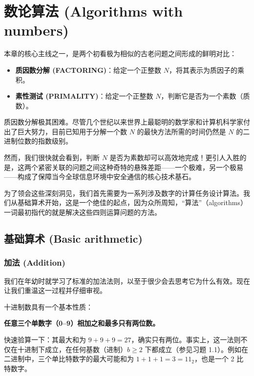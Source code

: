 \chapter{数论算法 (Algorithms with numbers)}

本章的核心主线之一，是两个初看极为相似的古老问题之间形成的鲜明对比：
\begin{itemize}
    \item \textbf{质因数分解 (FACTORING)}：给定一个正整数 $N$，将其表示为质因子的乘积。
    \item \textbf{素性测试 (PRIMALITY)}：给定一个正整数 $N$，判断它是否为一个素数（质数）。
\end{itemize}

质因数分解极其困难。尽管几个世纪以来世界上最聪明的数学家和计算机科学家付出了巨大努力，目前已知用于分解一个数 $N$ 的最快方法所需的时间仍然是 $N$ 的二进制位数的指数级别。

然而，我们很快就会看到，判断 $N$ 是否为素数却可以高效地完成！更引人入胜的是，这两个紧密关联的问题之间这种奇特的悬殊差距——一个极难，另一个极易——构成了保障当今全球信息环境中安全通信的核心技术基石。

为了领会这些深刻洞见，我们首先需要为一系列涉及数字的计算任务设计算法。我们从基础算术开始，这是一个绝佳的起点，因为众所周知，“算法”（algorithms）一词最初指代的就是解决这些四则运算问题的方法。

\section{基础算术 (Basic arithmetic)}

\subsection{加法 (Addition)}
我们在年幼时就学习了标准的加法法则，以至于很少会去思考它为什么有效。现在让我们重温这一过程并仔细审视。

十进制数具有一个基本性质：
\begin{center}
    \textbf{任意三个单数字（0--9）相加之和最多只有两位数。}
\end{center}
快速验算一下：其最大和为 $9 + 9 + 9 = 27$，确实只有两位。事实上，这一法则不仅在十进制下成立，在任何基数（进制）$b \ge 2$ 下都成立（参见习题 1.1）。例如在二进制中，三个单比特数字的最大可能和为 $1 + 1 + 1 = 3 = 11_2$，也是一个 2 比特数字。

